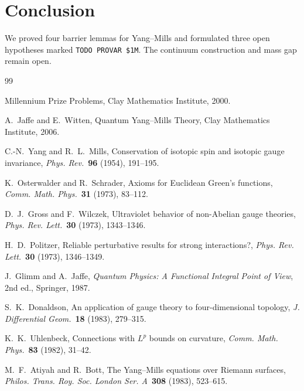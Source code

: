 \documentclass[12pt]{article}
\theoremstyle{plain}
\theoremstyle{definition}
\begin{document}
\section{Conclusion}

We proved four barrier lemmas for Yang--Mills and formulated three
open hypotheses marked \texttt{TODO PROVAR \$1M}.  The continuum
construction and mass gap remain open.


\begin{thebibliography}{99}

Millennium Prize Problems, Clay Mathematics Institute, 2000.

A.~Jaffe and E.~Witten,
Quantum Yang--Mills Theory,
Clay Mathematics Institute, 2006.

C.-N.~Yang and R.~L.~Mills,
Conservation of isotopic spin and isotopic gauge invariance,
\emph{Phys. Rev.}\ \textbf{96} (1954), 191--195.

K.~Osterwalder and R.~Schrader,
Axioms for Euclidean Green's functions,
\emph{Comm. Math. Phys.}\ \textbf{31} (1973), 83--112.

D.~J.~Gross and F.~Wilczek,
Ultraviolet behavior of non-Abelian gauge theories,
\emph{Phys. Rev. Lett.}\ \textbf{30} (1973), 1343--1346.

H.~D.~Politzer,
Reliable perturbative results for strong interactions?,
\emph{Phys. Rev. Lett.}\ \textbf{30} (1973), 1346--1349.

J.~Glimm and A.~Jaffe,
\emph{Quantum Physics: A Functional Integral Point of View}, 2nd ed.,
Springer, 1987.

S.~K.~Donaldson,
An application of gauge theory to four-dimensional topology,
\emph{J. Differential Geom.}\ \textbf{18} (1983), 279--315.

K.~K.~Uhlenbeck,
Connections with $L^p$ bounds on curvature,
\emph{Comm. Math. Phys.}\ \textbf{83} (1982), 31--42.

M.~F.~Atiyah and R.~Bott,
The Yang--Mills equations over Riemann surfaces,
\emph{Philos. Trans. Roy. Soc. London Ser. A}\ \textbf{308} (1983),
523--615.


\end{thebibliography}
\end{document}
